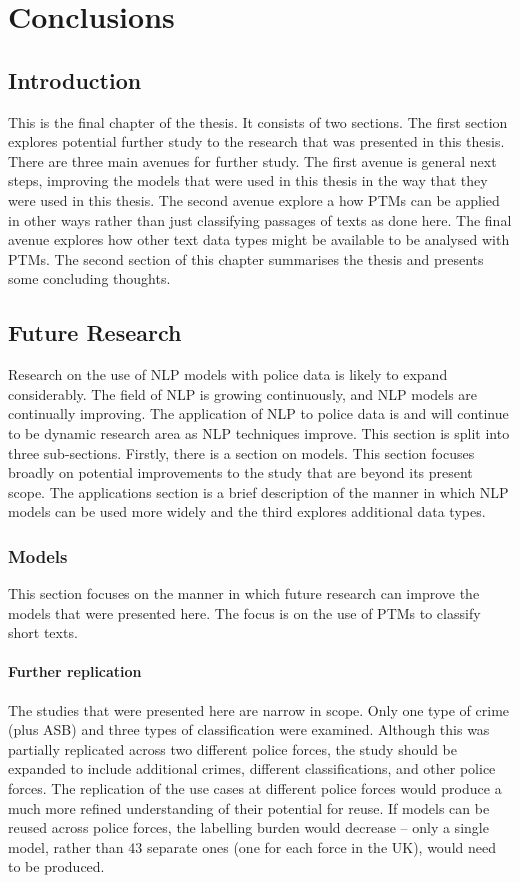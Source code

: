 \chapter{Conclusions}

\section{Introduction} This is the final chapter of the thesis. It consists of two sections. The first section explores potential further study to the research that was presented in this thesis. There are three main avenues for further study. The first avenue is general next steps, improving the models that were used in this thesis in the way that they were used in this thesis. The second avenue explore a how PTMs can be applied in other ways rather than just classifying passages of texts as done here. The final avenue explores how other text data types might be available to be analysed with PTMs. The second section of this chapter summarises the thesis and presents some concluding thoughts.

\section{Future Research} Research on the use of NLP models with police data is likely to expand considerably. The field of NLP is growing continuously, and NLP models are continually improving. The application of NLP to police data is and will continue to be dynamic research area as NLP techniques improve. This section is split into three sub-sections. Firstly, there is a section on models. This section focuses broadly on potential improvements to the study that are beyond its present scope. The applications section is a brief description of the manner in which NLP models can be used more widely and the third explores additional data types.

\subsection{Models} This section focuses on the manner in which future research can improve the models that were presented here. The focus is on the use of PTMs to classify short texts.

\subsubsection{Further replication} The studies that were presented here are narrow in scope. Only one type of crime (plus ASB) and three types of classification were examined. Although this was partially replicated across two different police forces, the study should be expanded to include additional crimes, different classifications, and other police forces. The replication of the use cases at different police forces would produce a much more refined understanding of their potential for reuse. If models can be reused across police forces, the labelling burden would decrease – only a single model, rather than 43 separate ones (one for each force in the UK), would need to be produced. 

